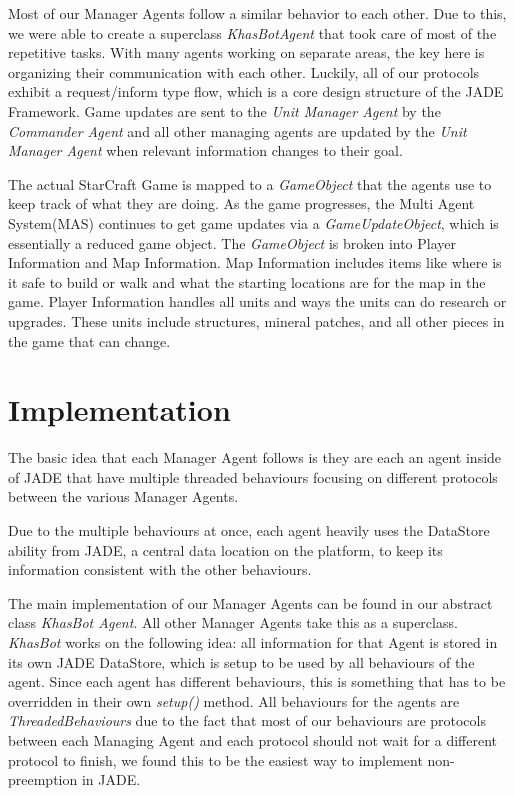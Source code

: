 \documentclass[letterpaper]{article}
\begin{document}
Most of our Manager Agents follow a similar behavior to each other. Due to this, we were able to create a superclass \emph{KhasBotAgent} that took care of most of the repetitive tasks.  With many agents working on separate areas, the key here is organizing their communication with each other.  Luckily, all of our protocols exhibit a request/inform type flow, which is a core design structure of the JADE Framework.  Game updates are sent to the \emph{Unit Manager Agent} by the \emph{Commander Agent} and all other managing agents are updated by the \emph{Unit Manager Agent} when relevant information changes to their goal.

The actual StarCraft Game is mapped to a \emph{GameObject} that the agents use to keep track of what they are doing.  As the game progresses, the Multi Agent System(MAS) continues to get game updates via a \emph{GameUpdateObject}, which is essentially a reduced game object.  The \emph{GameObject} is broken into Player Information and Map Information. Map Information includes items like where is it safe to build or walk and what the starting locations are for the map in the game.  Player Information handles all units and ways the units can do research or upgrades.  These units include structures, mineral patches, and all other pieces in the game that can change.

\section{Implementation}
The basic idea that each Manager Agent follows is they are each an agent inside of JADE that have multiple threaded behaviours focusing on different protocols between the various Manager Agents.

Due to the multiple behaviours at once, each agent heavily uses the DataStore ability from JADE, a central data location on the platform, to keep its information consistent with the other behaviours.

The main implementation of our Manager Agents can be found in our abstract class \emph{KhasBot Agent}. All other Manager Agents take this as a superclass. \emph{KhasBot} works on the following idea: all information for that Agent is stored in its own JADE DataStore, which is setup to be used by all behaviours of the agent. Since each agent has different behaviours, this is something that has to be overridden in their own \emph{setup()} method. All behaviours for the agents are \emph{ThreadedBehaviours} due to the fact that most of our behaviours are protocols between each Managing Agent and each protocol should not wait for a different protocol to finish, we found this to be the easiest way to implement non-preemption in JADE.
\end{document}

